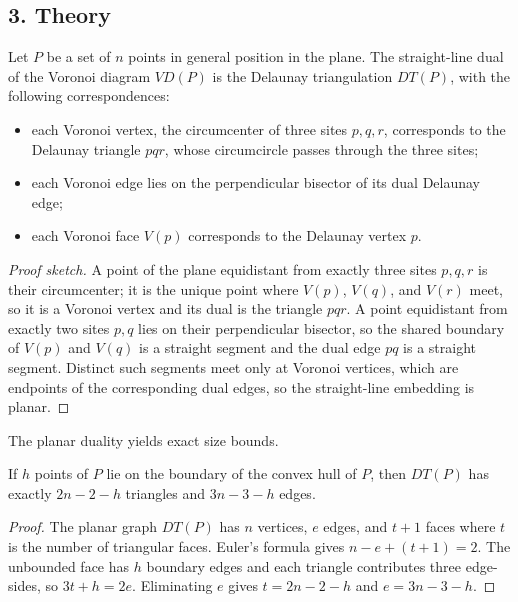\subsection{3. Theory}

\begin{theorem}[Duality]\label{thm:delaunay_duality}
Let $P$ be a set of $n$ points in general position in the plane. The
straight-line dual of the Voronoi diagram $VD(P)$ is the Delaunay triangulation
$DT(P)$, with the following correspondences:
\begin{itemize}
\item each Voronoi vertex, the circumcenter of three sites $p,q,r$, corresponds
  to the Delaunay triangle $pqr$, whose circumcircle passes through the three
  sites;
\item each Voronoi edge lies on the perpendicular bisector of its dual Delaunay
  edge;
\item each Voronoi face $V(p)$ corresponds to the Delaunay vertex $p$.
\end{itemize}
\end{theorem}

\begin{proof}[Proof sketch]
A point of the plane equidistant from exactly three sites $p,q,r$ is their
circumcenter; it is the unique point where $V(p)$, $V(q)$, and $V(r)$ meet, so
it is a Voronoi vertex and its dual is the triangle $pqr$. A point equidistant
from exactly two sites $p,q$ lies on their perpendicular bisector, so the shared
boundary of $V(p)$ and $V(q)$ is a straight segment and the dual edge $pq$ is a
straight segment. Distinct such segments meet only at Voronoi vertices, which
are endpoints of the corresponding dual edges, so the straight-line embedding
is planar.
\end{proof}

The planar duality yields exact size bounds.

\begin{corollary}[Size]\label{cor:delaunay_size}
If $h$ points of $P$ lie on the boundary of the convex hull of $P$, then $DT(P)$
has exactly $2n - 2 - h$ triangles and $3n - 3 - h$ edges.
\end{corollary}

\begin{proof}
The planar graph $DT(P)$ has $n$ vertices, $e$ edges, and $t + 1$ faces where
$t$ is the number of triangular faces. Euler's formula gives
$n - e + (t + 1) = 2$. The unbounded face has $h$ boundary edges and each
triangle contributes three edge-sides, so $3t + h = 2e$. Eliminating $e$ gives
$t = 2n - 2 - h$ and $e = 3n - 3 - h$.
\end{proof}

